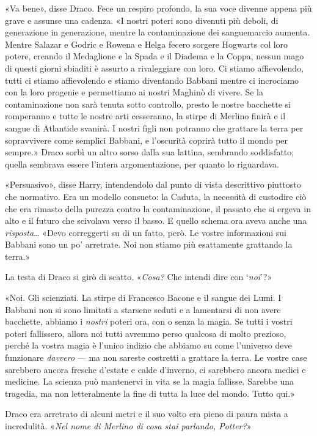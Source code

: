 «Va bene», disse Draco. Fece un respiro profondo, la sua voce divenne appena più grave e assunse una cadenza. «I nostri poteri sono divenuti più deboli, di generazione in generazione, mentre la contaminazione dei sanguemarcio aumenta. Mentre Salazar e Godric e Rowena e Helga fecero sorgere Hogwarts col loro potere, creando il Medaglione e la Spada e il Diadema e la Coppa, nessun mago di questi giorni sbiaditi è assurto a rivaleggiare con loro. Ci stiamo affievolendo, tutti ci stiamo affievolendo e stiamo diventando Babbani mentre ci incrociamo con la loro progenie e permettiamo ai nostri Maghinò di vivere. Se la contaminazione non sarà tenuta sotto controllo, presto le nostre bacchette si romperanno e tutte le nostre arti cesseranno, la stirpe di Merlino finirà e il sangue di Atlantide svanirà. I nostri figli non potranno che grattare la terra per sopravvivere come semplici Babbani, e l’oscurità coprirà tutto il mondo per sempre.» Draco sorbì un altro sorso dalla sua lattina, sembrando soddisfatto; quella sembrava essere l’intera argomentazione, per quanto lo riguardava.

«Persuasivo», disse Harry, intendendolo dal punto di vista descrittivo piuttosto che normativo. Era un modello consueto: la Caduta, la necessità di custodire ciò che era rimasto della purezza contro la contaminazione, il passato che si ergeva in alto e il futuro che scivolava verso il basso. E quello schema ora aveva anche una \textit{risposta}… «Devo correggerti su di un fatto, però. Le vostre informazioni sui Babbani sono un po’ arretrate. Noi non stiamo più esattamente grattando la terra.»

La testa di Draco si girò di scatto. «\textit{Cosa?} Che intendi dire con ‘\textit{noi}’?»

«Noi. Gli scienziati. La stirpe di Francesco Bacone e il sangue dei Lumi. I Babbani non si sono limitati a starsene seduti e a lamentarsi di non avere bacchette, abbiamo i \textit{nostri} poteri ora, con o senza la magia. Se tutti i vostri poteri fallissero, allora noi tutti avremmo perso qualcosa di molto prezioso, perché la vostra magia è l’unico indizio che abbiamo su come l’universo deve funzionare \textit{davvero} — ma non sareste costretti a grattare la terra. Le vostre case sarebbero ancora fresche d’estate e calde d’inverno, ci sarebbero ancora medici e medicine. La scienza può mantenervi in vita se la magia fallisse. Sarebbe una tragedia, ma non letteralmente la fine di tutta la luce del mondo. Tutto qui.»

Draco era arretrato di alcuni metri e il suo volto era pieno di paura mista a incredulità. «\textit{Nel nome di Merlino di cosa stai parlando, Potter?}»

